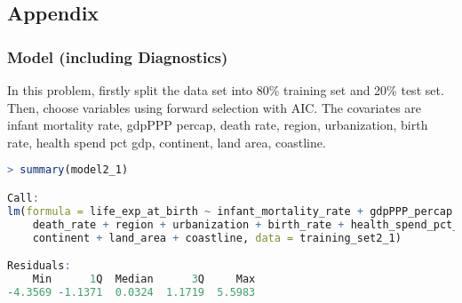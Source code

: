 \subsection{Appendix}
\subsubsection{Model (including Diagnostics)}
In this problem, firstly split the data set into 80\% training set and 20\% test set. Then, choose variables using forward selection with AIC. The covariates are infant mortality rate, gdpPPP percap, death rate, region, urbanization, birth rate, health spend pct gdp, continent, land area, coastline. 

\begin{lstlisting}[language=R, caption=Result of the model]
> summary(model2_1)

Call:
lm(formula = life_exp_at_birth ~ infant_mortality_rate + gdpPPP_percap + 
    death_rate + region + urbanization + birth_rate + health_spend_pct_gdp + 
    continent + land_area + coastline, data = training_set2_1)

Residuals:
    Min      1Q  Median      3Q     Max 
-4.3569 -1.1371  0.0324  1.1719  5.5983 


\end{lstlisting}
